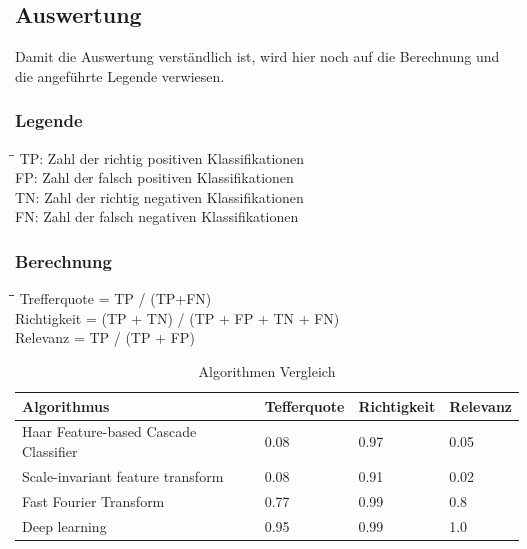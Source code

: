 \subsection{Auswertung}
Damit die Auswertung verständlich ist, wird hier noch auf die Berechnung und die angeführte Legende verwiesen.
\subsubsection{Legende}
\begin{tabbing}
    \hspace*{3cm}\=\hspace*{6cm}\= \kill
    TP:	\> Zahl der richtig positiven Klassifikationen\\
	FP:	\> Zahl der falsch positiven Klassifikationen\\
	TN:	\> Zahl der richtig negativen Klassifikationen\\
	FN:	\> Zahl der falsch negativen Klassifikationen\\
\end{tabbing}

\subsubsection{Berechnung}
\begin{tabbing}
    \hspace*{3cm}\=\hspace*{3cm}\=\hspace*{6cm}\= \kill
	Trefferquote \> = \> TP / (TP+FN)\\
	Richtigkeit \> = \> (TP + TN) / (TP + FP + TN + FN)\\
	Relevanz \> = \> TP / (TP + FP)\\
\end{tabbing}

\begin{table}[H]
    \begin{tabular}{|l|l|l|l|}
    \hline    
    \rowcolor{lightblue}
	Algorithmus & Tefferquote & Richtigkeit & Relevanz \\ \hline
	Haar Feature-based Cascade Classifier & 0.08 & 0.97 & 0.05 \\ \hline
	Scale-invariant feature transform & 0.08 & 0.91 & 0.02 \\ \hline
	Fast Fourier Transform & 0.77 & 0.99 & 0.8 \\ \hline
	Deep learning & 0.95 & 0.99 & 1.0 \\ \hline
    \end{tabular}
    \caption[Algorithmen Vergleich]{Algorithmen Vergleich}
\end{table}

